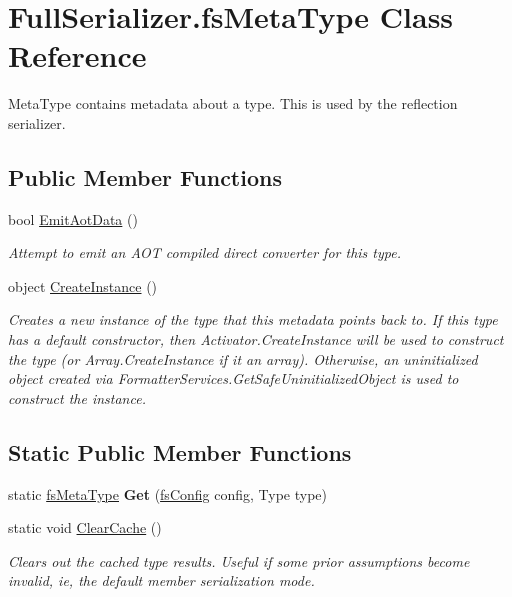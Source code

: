 \hypertarget{class_full_serializer_1_1fs_meta_type}{}\section{Full\+Serializer.\+fs\+Meta\+Type Class Reference}
\label{class_full_serializer_1_1fs_meta_type}


Meta\+Type contains metadata about a type. This is used by the reflection serializer.  


\subsection*{Public Member Functions}
\begin{DoxyCompactItemize}
\item 
bool \hyperlink{class_full_serializer_1_1fs_meta_type_a519eb6ef7c8ffe3b955a979007a1214c}{Emit\+Aot\+Data} ()
\begin{DoxyCompactList}\small\item\em Attempt to emit an A\+OT compiled direct converter for this type. \end{DoxyCompactList}\item 
object \hyperlink{class_full_serializer_1_1fs_meta_type_a2c5ea6c69f0e1bb29c6c4c11317926b5}{Create\+Instance} ()
\begin{DoxyCompactList}\small\item\em Creates a new instance of the type that this metadata points back to. If this type has a default constructor, then Activator.\+Create\+Instance will be used to construct the type (or Array.\+Create\+Instance if it an array). Otherwise, an uninitialized object created via Formatter\+Services.\+Get\+Safe\+Uninitialized\+Object is used to construct the instance. \end{DoxyCompactList}\end{DoxyCompactItemize}
\subsection*{Static Public Member Functions}
\begin{DoxyCompactItemize}
\item 
\mbox{\label{class_full_serializer_1_1fs_meta_type_a7958d481341e70175aae107ea82e329e}} 
static \hyperlink{class_full_serializer_1_1fs_meta_type}{fs\+Meta\+Type} {\bfseries Get} (\hyperlink{class_full_serializer_1_1fs_config}{fs\+Config} config, Type type)
\item 
static void \hyperlink{class_full_serializer_1_1fs_meta_type_af2c4148ca9a3f9fe8d898e20035465b8}{Clear\+Cache} ()
\begin{DoxyCompactList}\small\item\em Clears out the cached type results. Useful if some prior assumptions become invalid, ie, the default member serialization mode. \end{DoxyCompactList}\end{DoxyCompactItemize}
